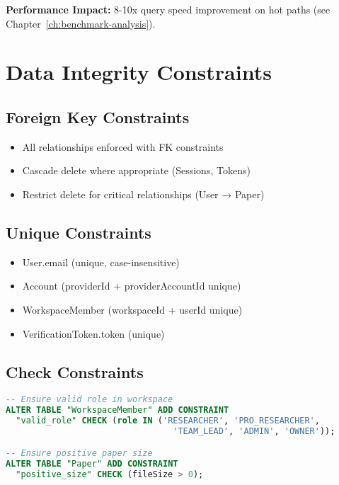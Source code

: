 \noindent
\textbf{Performance Impact:} 8-10x query speed improvement on hot paths (see Chapter~\ref{ch:benchmark-analysis}).

\section{Data Integrity Constraints}
\label{sec:erd-integrity}

\subsection{Foreign Key Constraints}

\begin{itemize}[leftmargin=*]
    \item All relationships enforced with FK constraints
    \item Cascade delete where appropriate (Sessions, Tokens)
    \item Restrict delete for critical relationships (User → Paper)
\end{itemize}

\subsection{Unique Constraints}

\begin{itemize}[leftmargin=*]
    \item User.email (unique, case-insensitive)
    \item Account (providerId + providerAccountId unique)
    \item WorkspaceMember (workspaceId + userId unique)
    \item VerificationToken.token (unique)
\end{itemize}

\subsection{Check Constraints}

\begin{lstlisting}[language=SQL, caption={Example Check Constraints}]
-- Ensure valid role in workspace
ALTER TABLE "WorkspaceMember" ADD CONSTRAINT 
  "valid_role" CHECK (role IN ('RESEARCHER', 'PRO_RESEARCHER', 
                                 'TEAM_LEAD', 'ADMIN', 'OWNER'));

-- Ensure positive paper size
ALTER TABLE "Paper" ADD CONSTRAINT 
  "positive_size" CHECK (fileSize > 0);
\end{lstlisting}
